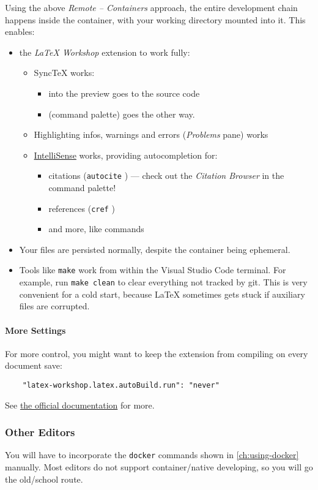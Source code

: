 Using the above \emph{Remote -- Containers} approach, the entire development chain happens inside the container, with your working directory mounted into it.
This enables:
\begin{itemize}
    \item the \emph{LaTeX Workshop} extension to work fully:
        \begin{itemize}
            \item SyncTeX works:
                \begin{itemize}
                    \item {} into the  preview goes to the source code
                    \item {} (command palette) goes the other way.
                \end{itemize}
            \item Highlighting infos, warnings and errors (\emph{Problems} pane) works
            \item \href{https://github.com/James-Yu/LaTeX-Workshop/wiki/Intellisense}{IntelliSense} works, providing autocompletion for:
                \begin{itemize}
                    \item citations (\texttt{autocite} ) --- check out the \emph{Citation Browser} in the command palette!
                    \item references (\texttt{cref} )
                    \item and more, like commands
                \end{itemize}
        \end{itemize}
    \item Your files are persisted normally, despite the container being ephemeral.
    \item Tools like \texttt{make} work from within the Visual Studio Code terminal.
        For example, run \texttt{make clean} to clear everything not tracked by git.
        This is very convenient for a cold start, because \LaTeX{} sometimes gets stuck if auxiliary files are corrupted.
\end{itemize}

\paragraph{More Settings}
For more control, you might want to keep the extension from compiling on every document save:
\begin{verbatim}
    "latex-workshop.latex.autoBuild.run": "never"
\end{verbatim}
See \href{https://github.com/James-Yu/LaTeX-Workshop/wiki/Compile#latex-recipes}{the official documentation} for more.

\subsubsection{Other Editors}

You will have to incorporate the \texttt{docker} commands shown in \cref{ch:using-docker} manually.
Most editors do not support container\-/native developing, so you will go the old\-/school route.
